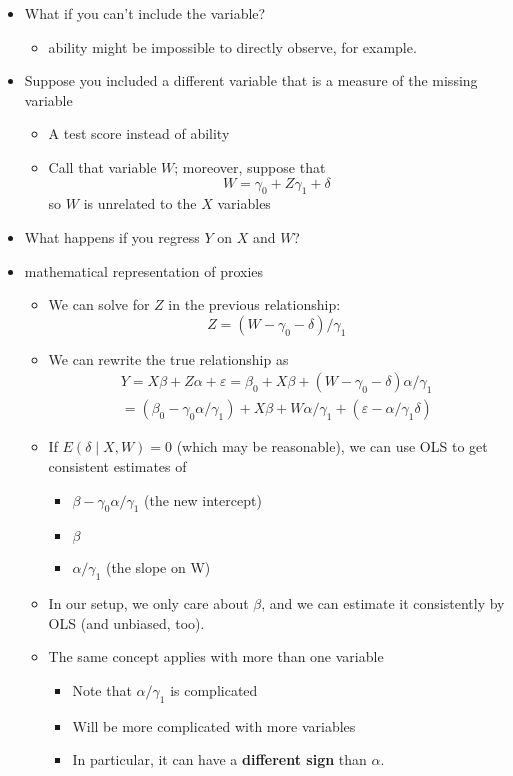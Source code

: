 \begin{itemize}
\item What if you can't include the variable?
\begin{itemize}
\item ability might be impossible to directly observe, for
            example.
\end{itemize}
\item Suppose you included a different variable that is a measure
          of the missing variable
\begin{itemize}
\item A test score instead of ability
\item Call that variable $W$; moreover, suppose that
            \[W = \gamma_{0} + Z \gamma_{1} + \delta\]
            so $W$ is unrelated to the $X$ variables
\end{itemize}
\item What happens if you regress $Y$ on $X$ and $W$?
\end{itemize}
\begin{itemize}

\item mathematical representation of proxies
\label{sec-2-1-1-2-2-1}%
\begin{itemize}
\item We can solve for $Z$ in the previous relationship:
           \[ Z = (W - \gamma_{0} - \delta ) / \gamma_{1} \]
\item We can rewrite the true relationship as
  \begin{multline} 
    Y = X \beta + Z \alpha + \varepsilon = \beta_{0} + X\beta + (W -
    \gamma_{0} - \delta) \alpha/\gamma_{1} \\ = (\beta_{0} -
    \gamma_{0}\alpha/\gamma_{1}) + X\beta + W
    \alpha/\gamma_{1} + (\varepsilon - \alpha/\gamma_{1} \delta)
  \end{multline}
\item If $E(\delta \mid X, W) = 0$ (which may be reasonable), we
           can use OLS to get consistent estimates of
\begin{itemize}
\item $\beta-\gamma_{0}\alpha/\gamma_{1}$ (the new intercept)
\item $\beta$
\item $\alpha/\gamma_{1}$ (the slope on W)
\end{itemize}
\item In our setup, we only care about $\beta$, and we can
           estimate it consistently by OLS (and unbiased, too).
\item The same concept applies with more than one variable
\begin{itemize}
\item Note that $\alpha/\gamma_{1}$ is complicated
\item Will be more complicated with more variables
\item In particular, it can have a \textbf{different sign} than $\alpha$.
\end{itemize}
\end{itemize}
\end{itemize} %
